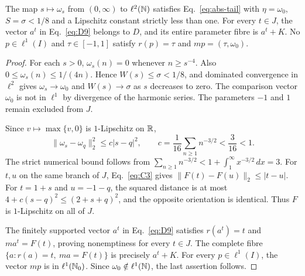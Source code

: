 \begin{lemma}
\label{lem:coordinate-profile}
The map $s\mapsto\omega_s$ from $(0,\infty)$ to $\ell^2(\mathbb N)$
satisfies Eq.~\eqref{eq:abs-tail} with $\eta=\omega_0$, $S=\sigma<1/8$
and a Lipschitz constant strictly less than one. For every $t\in J$,
the vector $a^t$ in Eq.~\eqref{eq:D9} belongs to $D$, and its entire
parameter fibre is $a^t+K$. No $p\in\ell^1(I)$ and $\tau\in[-1,1]$
satisfy $r(p)=\tau$ and $mp=(\tau,\omega_0)$.
\end{lemma}
\begin{proof}
\label{sec:C2}
For each $s>0$, $\omega_s(n)=0$ whenever $n\ge s^{-4}$. Also
$0\le\omega_s(n)\le1/(4n)$. Hence $W(s)\le\sigma<1/8$, and dominated
convergence in $\ell^2$ gives $\omega_s\to\omega_0$ and $W(s)\to\sigma$
as $s$ decreases to zero. The comparison vector $\omega_0$ is not in
$\ell^1$ by divergence of the harmonic series. The parameters $-1$ and $1$
remain excluded from $J$.

Since $v\mapsto\max\{v,0\}$ is $1$-Lipschitz on $\mathbb R$,
\begin{equation}
\|\omega_s-\omega_q\|_2^2\le c|s-q|^2,\qquad
c=\frac1{16}\sum_{n\ge1}n^{-3/2}<\frac3{16}<1.
\label{eq:C3}
\end{equation}
The strict numerical bound follows from
$\sum_{n\ge1}n^{-3/2}<1+\int_1^\infty x^{-3/2}\,dx=3$.
For $t,u$ on the same branch of $J$, Eq.~\eqref{eq:C3} gives
$\|F(t)-F(u)\|_2\le|t-u|$. For $t=1+s$ and $u=-1-q$, the squared
distance is at most $4+c(s-q)^2\le(2+s+q)^2$, and the opposite
orientation is identical. Thus $F$ is $1$-Lipschitz on all of $J$.

The finitely supported vector $a^t$ in Eq.~\eqref{eq:D9} satisfies $r(a^t)=t$ and
$ma^t=F(t)$, proving nonemptiness for every $t\in J$. The complete
fibre $\{a:r(a)=t,\ ma=F(t)\}$ is precisely $a^t+K$.
For every $p\in\ell^1(I)$, the vector $mp$ is in $\ell^1(\mathbb N_0)$.
Since $\omega_0\notin\ell^1(\mathbb N)$, the last assertion follows.
\end{proof}

